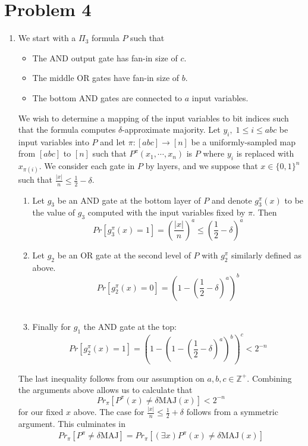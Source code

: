 \documentclass[12pt]{article}%
\begin{document}
\section{Problem 4}
\begin{enumerate}
  \item We start with a $\Pi_3$ formula $P$ such that
    \begin{itemize}
      \item The AND output gate has fan-in size of $c$.
      \item The middle OR gates have fan-in size of $b$.
      \item The bottom AND gates are connected to $a$ input variables.
    \end{itemize}
    We wish to determine a mapping of the input variables to bit indices such that the formula computes $\delta$-approximate majority. Let $y_{i}, \; 1 \leq i \leq abc$ be input variables into $P$ and let $\pi: [abc] \rightarrow [n]$ be a uniformly-sampled map from $[abc]$ to $[n]$ such that $P^{\pi}(x_1,\cdots, x_n)$ is $P$ where $y_{i}$ is replaced with $x_{\pi(i)}$. We consider each gate in $P$ by layers, and we suppose that $x \in \{0,1\}^n$ such that $\frac{|x|}{n} \leq \frac{1}{2} - \delta$.
    \begin{enumerate}
      \item Let $g_3$ be an AND gate at the bottom layer of $P$ and denote $g^\pi_3(x)$ to be the value of $g_3$ computed with the input variables fixed by $\pi$. Then
      $$ Pr[g_3^\pi(x) = 1] = \left( \frac{|x|}{n} \right)^a \leq \left( \frac{1}{2} - \delta \right)^a$$
      \item Let $g_2$ be an OR gate at the second level of $P$ with $g_2^\pi$ similarly defined as above.
      $$ Pr[g_2^\pi(x) = 0] = \left( 1 - \left( \frac{1}{2} - \delta \right)^a \right)^b $$\
      \item Finally for $g_1$ the AND gate at the top:
      $$ Pr[g_2^\pi(x) = 1] = \left(1 -  \left( 1 - \left( \frac{1}{2} - \delta \right)^a \right)^b \right)^c < 2^{-n} $$
    \end{enumerate}
    The last inequality follows from our assumption on $a,b,c \in \mathbb{Z}^+$. Combining the arguments above allows us to calculate that
     $$ Pr_\pi[P^{\pi}(x) \neq \delta\text{MAJ}(x)] < 2^{-n}$$ for our fixed $x$ above. The case for $\frac{|x|}{n} \leq \frac{1}{2} + \delta$ follows from a symmetric argument. This culminates in
     \begin{align*}
       Pr_\pi[P^{\pi}\neq \delta\text{MAJ}] = Pr_\pi[(\exists x) P^{\pi}(x) \neq \delta\text{MAJ}(x)]

\end{align*}
\end{enumerate}
\end{document}
